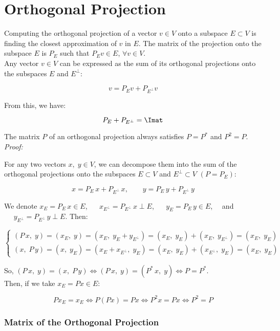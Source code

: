 \section*{Orthogonal Projection}

Computing the orthogonal projection of a vector $v\in V$ onto a subspace $E \subset V$ is finding the closest approximation of $v$ in $E$. The matrix of the projection onto the subspace $E$ is $P_E$ such that $P_Ev\in E$, $\forall v\in V$.\\

Any vector $v\in V$ can be expressed as the sum of its orthogonal projections onto the subspaces $E$ and $E^\perp$:

$$v=P_Ev+P_{E^\perp}v$$

From this, we have:

$$P_E+P_{E^\perp}=\Imat$$

The matrix $P$ of an orthogonal projection always satisfies $P=P^*$ and $P^2=P$.\\

\textit{Proof:}

For any two vectors $x,\;y\in V$, we can decompose them into the sum of the orthogonal projections onto the subspaces $E\subset V$ and $E^\perp \subset V$ $(P=P_E)$:

$$x=P_E\,x+P_{E^\perp}\,x,\text{ }\text{ }\text{ }y=P_E\,y+P_{E^\perp}\,y$$

We denote $x_E=P_E\,x\in E$, $\text{ }\text{ }x_{E^\perp}=P_{E^\perp}\,x \perp E$, $\text{ }\text{ }y_E=P_E\,y \in E$, $\text{ }$ and $\text{ }\text{ }y_{E^\perp}=P_{E^\perp}\,y\perp E$. Then:

$$
    \begin{cases}
      (P\,x,\;y)=(x_E,\;y)=(x_E,\;y_E+y_{E^\perp})=(x_E,\;y_E)+(x_E,\;y_{E^\perp})=(x_E,\;y_E)\\
      (x,\;P\,y)=(x,\;y_E)=(x_E+x_{E^\perp},\;y_E)=(x_E,\;y_E)+(x_{E^\perp},\;y_E)=(x_E,\;y_E)
    \end{cases}
$$

So, $(P\,x,\;y)=(x,\;P\,y)\Leftrightarrow(P\,x,\;y)=(P^*\,x,\;y)\Leftrightarrow P=P^*$.\\

Then, if we take $x_E=Px\in E$:

$$Px_E=x_E\Leftrightarrow P(Px)=Px \Leftrightarrow P^2x=Px\Leftrightarrow P^2=P$$

\subsubsection{Matrix of the Orthogonal Projection}

